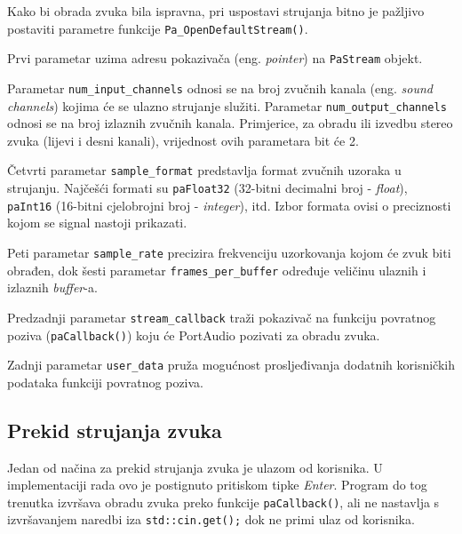 \documentclass[times, utf8, diplomski, numeric]{fer}
\begin{document}
Kako bi obrada zvuka bila ispravna, pri uspostavi strujanja bitno je pažljivo postaviti parametre funkcije \lstinline[basicstyle=\ttfamily]|Pa_OpenDefaultStream()|. 

Prvi parametar uzima adresu pokazivača (eng. \textit{pointer}) na \lstinline[basicstyle=\ttfamily]|PaStream| objekt.  

Parametar \lstinline[basicstyle=\ttfamily]|num_input_channels| odnosi se na broj zvučnih kanala (eng. \textit{sound channels}) kojima će se ulazno strujanje služiti. Parametar \lstinline[basicstyle=\ttfamily]|num_output_channels| odnosi se na broj izlaznih zvučnih kanala. Primjerice, za obradu ili izvedbu stereo zvuka (lijevi i desni kanali), vrijednost ovih parametara bit će 2.

Četvrti parametar \lstinline[basicstyle=\ttfamily]|sample_format| predstavlja format zvučnih uzoraka u strujanju. Najčešći formati su \lstinline[basicstyle=\ttfamily]|paFloat32| (32-bitni decimalni broj - \textit{float}), \lstinline[basicstyle=\ttfamily]|paInt16| (16-bitni cjelobrojni broj - \textit{integer}), itd. Izbor formata ovisi o preciznosti kojom se signal nastoji prikazati.

Peti parametar \lstinline[basicstyle=\ttfamily]|sample_rate| precizira frekvenciju uzorkovanja kojom će zvuk biti obrađen, dok šesti parametar \lstinline[basicstyle=\ttfamily]|frames_per_buffer| određuje veličinu ulaznih i izlaznih \textit{buffer}-a.

Predzadnji parametar \lstinline[basicstyle=\ttfamily]|stream_callback| traži pokazivač na funkciju povratnog poziva (\lstinline[basicstyle=\ttfamily]|paCallback()|) koju će PortAudio pozivati za obradu zvuka.

Zadnji parametar \lstinline[basicstyle=\ttfamily]|user_data| pruža mogućnost prosljeđivanja dodatnih korisničkih podataka funkciji povratnog poziva.

\subsection{Prekid strujanja zvuka}

Jedan od načina za prekid strujanja zvuka je ulazom od korisnika. U implementaciji rada ovo je postignuto pritiskom tipke \textit{Enter}. Program do tog trenutka izvršava obradu zvuka preko funkcije \lstinline[basicstyle=\ttfamily]|paCallback()|, ali ne nastavlja s izvršavanjem naredbi iza \lstinline[basicstyle=\ttfamily]|std::cin.get();| dok ne primi ulaz od korisnika.
\end{document}
